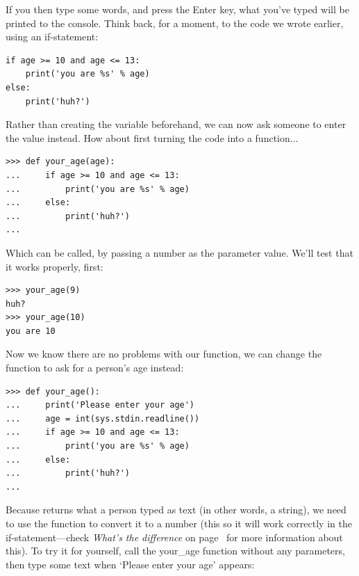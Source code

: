 If you then type some words, and press the Enter key, what you've typed will be printed to the console. Think back, for a moment, to the code we wrote earlier, using an if-statement:

\begin{listing}
\begin{verbatim}
if age >= 10 and age <= 13:
    print('you are %s' % age)
else:
    print('huh?')
\end{verbatim}
\end{listing}

Rather than creating the variable  beforehand, we can now ask someone to enter the value instead.  How about first turning the code into a function$\ldots$

\begin{listing}
\begin{verbatim}
>>> def your_age(age):
...     if age >= 10 and age <= 13:
...         print('you are %s' % age)
...     else:
...         print('huh?')
... 
\end{verbatim}
\end{listing}

Which can be called, by passing a number as the parameter value.  We'll test that it works properly, first:

\begin{listing}
\begin{verbatim}
>>> your_age(9)
huh?
>>> your_age(10)
you are 10
\end{verbatim}
\end{listing}

Now we know there are no problems with our function, we can change the function to ask for a person's age instead:

\begin{listing}
\begin{verbatim}
>>> def your_age():
...     print('Please enter your age')
...     age = int(sys.stdin.readline())
...     if age >= 10 and age <= 13:
...         print('you are %s' % age)
...     else:
...         print('huh?')
... 
\end{verbatim}
\end{listing}

Because  returns what a person typed as text (in other words, a string), we need to use the function  to convert it to a number (this so it will work correctly in the if-statement---check \emph{What's the difference} on page~\pageref{whatsthedifference} for more information about this).  To try it for yourself, call the your\_age function without any parameters, then type some text when `Please enter your age' appears:

